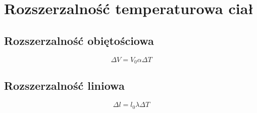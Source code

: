     \section{Rozszerzalność temperaturowa ciał}
      \subsection{Rozszerzalność obiętościowa}
        \begin{equation}
          \Delta V = V_0\alpha\Delta T
        \end{equation}
      \subsection{Rozszerzalność liniowa}
        \begin{equation}
          \Delta l = l_0\lambda\Delta T
        \end{equation}
